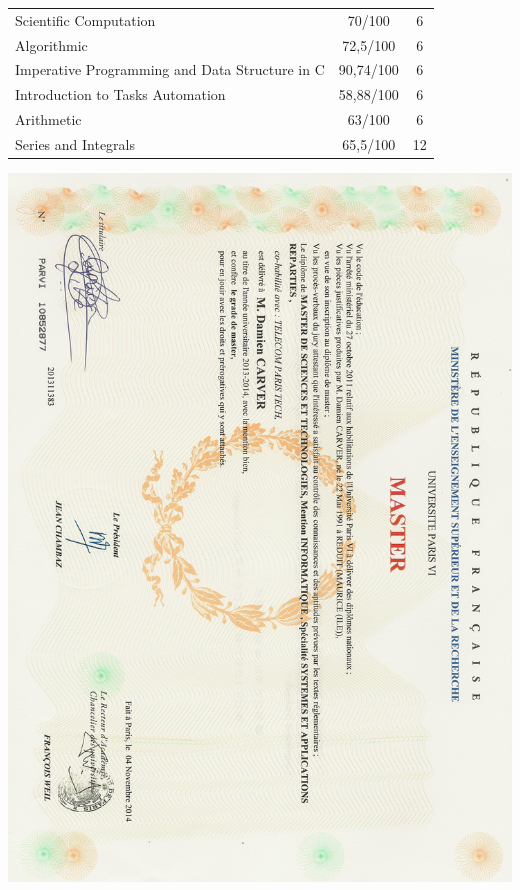 \documentclass[a4paper,10pt]{article} %
\begin{document}
\begin{center}
\begin{tabular}{lcc}
Scientific Computation                                     &    70/100 & 6     \\
Algorithmic                                                &  72,5/100 & 6     \\
\hline
Imperative Programming and Data Structure in C             & 90,74/100 & 6     \\
Introduction to Tasks Automation                           & 58,88/100 & 6     \\
Arithmetic                                                 &    63/100 & 6     \\
Series and Integrals                                       &  65,5/100 & 12    \\
\hline
\end{tabular}
\end{center}


\newpage

\includegraphics[scale=0.7]{./m2.jpeg}

\end{document}
